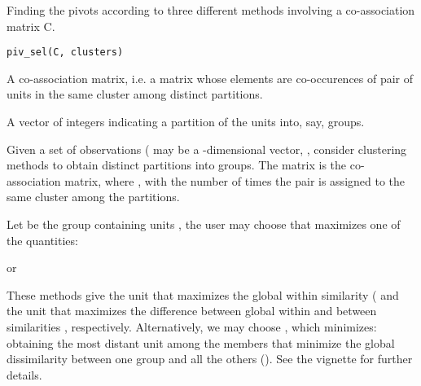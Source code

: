 \documentclass[a4paper]{book}
\begin{document}
%
\begin{Description}\relax
Finding the pivots according to three different
methods involving a co-association matrix C.
\end{Description}
%
\begin{Usage}
\begin{verbatim}
piv_sel(C, clusters)
\end{verbatim}
\end{Usage}
%
\begin{Arguments}
\begin{ldescription}
\item[\code{C}] A  co-association matrix, i.e.
a matrix whose elements are co-occurences of pair of units
in the same cluster among  distinct partitions.

\item[\code{clusters}] A vector of integers indicating
a partition of the  units into, say,  groups.
\end{ldescription}
\end{Arguments}
%
\begin{Details}\relax
Given a set of  observations 
( may be a -dimensional vector, ,
consider clustering methods to obtain  distinct partitions
into  groups.
The matrix  is the co-association matrix,
where , with  the number of times
the pair  is assigned to the same
cluster among the  partitions.

Let  be the group containing units ,
the user may choose  that
maximizes one of the quantities:

or

These methods give the unit that maximizes the global
within similarity ( and the unit that
maximizes the difference between global within and
between similarities , respectively.
Alternatively, we may choose , which minimizes:
obtaining the most distant unit among the members
that minimize the global dissimilarity between one group
and all the others ().
See the vignette for further details.
\end{Details}
\end{document}
